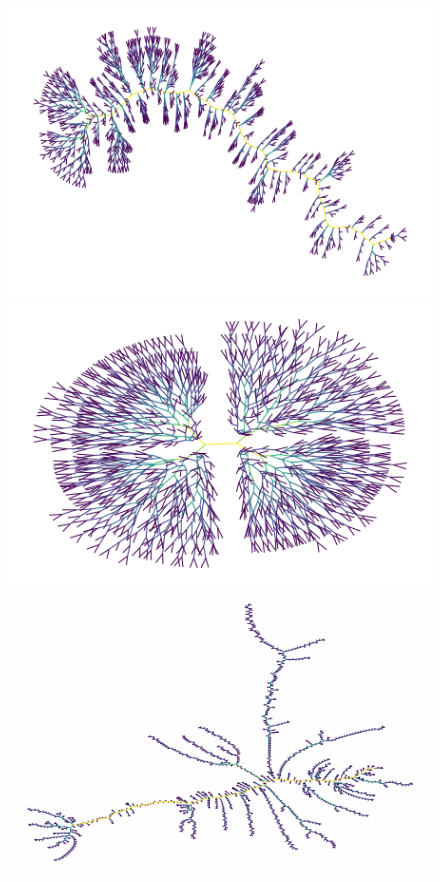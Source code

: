 \documentclass[12pt,twoside]{report}
\begin{document}
\begin{figure}[H]
\begin{center}
\begin{minipage}{0.45\linewidth}
\includegraphics[width=\linewidth]{figures/er_bifurcations.png}
\end{minipage}%
\hfill
\begin{minipage}{0.45\linewidth}
\includegraphics[width=\linewidth]{figures/fractal_bifurcation.png}
\end{minipage}%
\hfill
\begin{minipage}{0.45\linewidth}
\includegraphics[width=\linewidth]{figures/uvl_bifurcations.png}

\end{minipage}
\end{center}
\end{figure}
\end{document}

